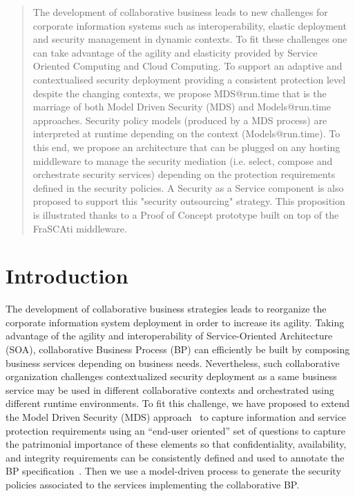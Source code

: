\documentclass[runningheads,a4paper]{llncs}
\begin{document}
\begin{abstract}
The development of collaborative business leads to new challenges for corporate information systems such as interoperability, elastic deployment and security management in dynamic contexts. To fit these challenges one can take advantage of the agility and elasticity provided by Service Oriented Computing and Cloud Computing. To support an adaptive and contextualised security deployment providing a consistent protection level despite the changing contexts, we propose MDS@run.time that is the marriage of both Model Driven Security (MDS) and Models@run.time approaches. Security policy models (produced by a MDS process) are interpreted at runtime depending on the context (Models@run.time). To this end, we propose an architecture that can be plugged on any hosting middleware to manage the security mediation (i.e. select, compose and orchestrate security services) depending on the protection requirements defined in the security policies. A Security as a Service component is also proposed to support this "security outsourcing" strategy. This proposition is illustrated thanks to a Proof of Concept prototype built on top of the FraSCAti middleware.
\end{abstract}

\section{Introduction}
The development of collaborative business strategies leads to reorganize the corporate information system deployment in order to increase its agility. Taking advantage of the agility and interoperability of Service-Oriented Architecture (SOA), collaborative Business Process (BP) can efficiently be built by composing business services depending on business needs. Nevertheless, such collaborative organization challenges contextualized security deployment as a same business service may be used in different collaborative contexts and orchestrated using different runtime environments.
To fit this challenge, we have proposed to extend the Model Driven Security (MDS) approach~\cite{LS09} to capture information and service protection requirements using an “end-user oriented” set of questions to capture the patrimonial importance of these elements so that confidentiality, availability, and integrity requirements can be consistently defined and used to annotate the BP specification~\cite{OBG12}. Then we use a model-driven process to generate the security policies associated to the services implementing the collaborative BP.
\end{document}
